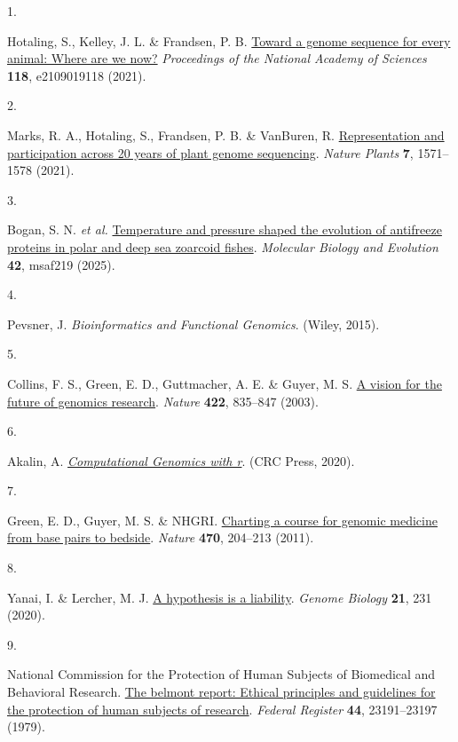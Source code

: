 \documentclass[
  letterpaper,
  DIV=11,
  numbers=noendperiod]{scrreprt}
\newlength{\cslhangindent}
\newlength{\csllabelwidth}
\newenvironment{CSLReferences}[2] %
 {\begin{list}{}{%
  \setlength{\itemindent}{0pt}
  \setlength{\leftmargin}{0pt}
  \setlength{\parsep}{0pt}
  \ifodd #1
   \setlength{\leftmargin}{\cslhangindent}
   \setlength{\itemindent}{-1\cslhangindent}
  \fi
  \setlength{\itemsep}{#2\baselineskip}}}
 {\end{list}}
\newcommand{\CSLLeftMargin}[1]{\parbox[t]{\csllabelwidth}{\strut#1\strut}}
\newcommand{\CSLRightInline}[1]{\parbox[t]{\linewidth - \csllabelwidth}{\strut#1\strut}}
\begin{document}
\label{refs}
\begin{CSLReferences}{0}{0}
\CSLLeftMargin{1. }%
\CSLRightInline{Hotaling, S., Kelley, J. L. \& Frandsen, P. B.
\href{https://doi.org/10.1073/pnas.2109019118}{Toward a genome sequence
for every animal: Where are we now?} \emph{Proceedings of the National
Academy of Sciences} \textbf{118}, e2109019118 (2021).}

\CSLLeftMargin{2. }%
\CSLRightInline{Marks, R. A., Hotaling, S., Frandsen, P. B. \& VanBuren,
R. \href{https://doi.org/10.1038/s41477-021-01031-8}{Representation and
participation across 20 years of plant genome sequencing}. \emph{Nature
Plants} \textbf{7}, 1571--1578 (2021).}

\CSLLeftMargin{3. }%
\CSLRightInline{Bogan, S. N. \emph{et al.}
\href{https://doi.org/10.1093/molbev/msaf219}{Temperature and pressure
shaped the evolution of antifreeze proteins in polar and deep sea
zoarcoid fishes}. \emph{Molecular Biology and Evolution} \textbf{42},
msaf219 (2025).}

\CSLLeftMargin{4. }%
\CSLRightInline{Pevsner, J. \emph{Bioinformatics and Functional
Genomics}. (Wiley, 2015).}

\CSLLeftMargin{5. }%
\CSLRightInline{Collins, F. S., Green, E. D., Guttmacher, A. E. \&
Guyer, M. S. \href{https://doi.org/10.1038/nature01626}{A vision for the
future of genomics research}. \emph{Nature} \textbf{422}, 835--847
(2003).}

\CSLLeftMargin{6. }%
\CSLRightInline{Akalin, A.
\emph{\href{https://compgenomr.github.io/book/}{Computational Genomics
with r}}. (CRC Press, 2020).}

\CSLLeftMargin{7. }%
\CSLRightInline{Green, E. D., Guyer, M. S. \& NHGRI.
\href{https://doi.org/10.1038/nature09764}{Charting a course for genomic
medicine from base pairs to bedside}. \emph{Nature} \textbf{470},
204--213 (2011).}

\CSLLeftMargin{8. }%
\CSLRightInline{Yanai, I. \& Lercher, M. J.
\href{https://doi.org/10.1186/s13059-020-02133-w}{A hypothesis is a
liability}. \emph{Genome Biology} \textbf{21}, 231 (2020).}

\CSLLeftMargin{9. }%
\CSLRightInline{National Commission for the Protection of Human Subjects
of Biomedical and Behavioral Research.
\href{https://www.hhs.gov/ohrp/regulations-and-policy/belmont-report/read-the-belmont-report/index.html}{The
belmont report: Ethical principles and guidelines for the protection of
human subjects of research}. \emph{Federal Register} \textbf{44},
23191--23197 (1979).}


\end{CSLReferences}
\end{document}
